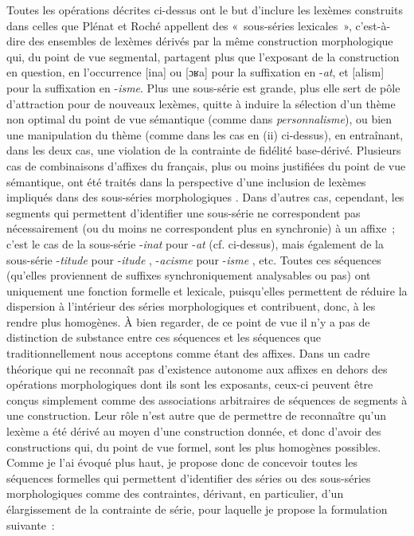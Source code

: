 \documentclass[output=paper]{langsci/langscibook}
\begin{document}
Toutes les opérations décrites ci-dessus ont le but d'inclure les
lexèmes cons\-truits dans celles que Plénat et Roché appellent des
«~sous-séries lexicales~», c'est-à-dire des ensembles de lexèmes dérivés
par la même construction morphologique qui, du point de vue segmental,
partagent plus que l'exposant de la construction en question, en
l'occurrence {[}ina{]} ou {[}ɔʁa{]} pour la suffixation en -\emph{at},
et {[}alism{]} pour la suffixation en -\emph{isme}. Plus une sous-série
est grande, plus elle sert de pôle d'attraction pour de nouveaux
lexèmes, quitte à induire la sélection d'un thème  non
optimal du point de vue sémantique (comme dans \emph{personnalisme}), ou
bien une manipulation du thème (comme dans les cas en (ii) ci-dessus), en
entraînant, dans les deux cas, une violation de la contrainte de
fidélité base-dérivé. Plusieurs cas de combinaisons d'affixes du
français, plus ou moins justifiées du point de vue sémantique, ont été
traités dans la perspective d'une inclusion de lexèmes impliqués dans
des sous-séries morphologiques %
\citep[cf.][]{Roche2009,Roche2011b,namer2013,Lignon2014}%
%
. Dans d'autres cas, cependant, les segments
qui permettent d'identifier une sous-série ne correspondent pas
nécessairement (ou du moins ne correspondent plus en synchronie) à un
affixe~; c'est le cas de la sous-série ‑\emph{inat} pour -\emph{at} (cf.
ci-dessus), mais également de la sous-série -\emph{titude} pour
-\emph{itude} %
\citep[53]{Plenat-Roche2014}%
%
, -\emph{acisme} pour
-\emph{isme} %
\citep[85]{Roche2011b}%
%
, etc. Toutes ces séquences (qu'elles
proviennent de suffixes synchroniquement analysables ou pas) ont
uniquement une fonction formelle et lexicale, puisqu'elles permettent de
réduire la dispersion à l'intérieur des séries morphologiques et
contribuent, donc, à les rendre plus homogènes. À bien regarder, de ce
point de vue il n'y a pas de distinction de substance entre ces
séquences et les séquences que traditionnellement nous acceptons comme
étant des affixes. Dans un cadre théorique qui ne reconnaît pas
d'existence autonome aux affixes en dehors des opérations morphologiques
dont ils sont les exposants, ceux-ci peuvent être conçus simplement
comme des associations arbitraires de séquences de segments à une
construction. Leur rôle n'est autre que de permettre de reconnaître
qu'un lexème a été dérivé au moyen d'une construction donnée, et donc
d'avoir des constructions qui, du point de vue formel, sont les plus
homogènes possibles. Comme je l'ai évoqué plus haut, je propose donc de
concevoir toutes les séquences formelles qui permettent d'identifier des
séries ou des sous-séries morphologiques comme des contraintes,
dérivant, en particulier, d'un élargissement de la contrainte de série,
pour laquelle je propose la formulation suivante~:
\end{document}
